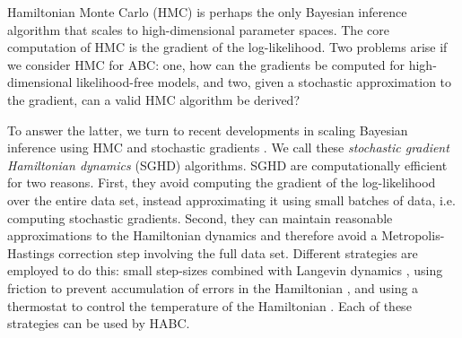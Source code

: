 \documentclass[]{article}
\begin{document}
Hamiltonian Monte Carlo (HMC) \cite{duane1987hybrid, neal2011mcmc} is perhaps the only Bayesian inference algorithm that scales to high-dimensional parameter spaces.  The core computation of HMC is the gradient of the log-likelihood.  Two problems arise if we consider HMC for ABC: one, how can the gradients be computed for high-dimensional likelihood-free models, and two, given a stochastic approximation to the gradient, can a valid HMC algorithm be derived?
 
 To answer the latter, we turn to recent developments in scaling Bayesian inference using HMC and stochastic gradients \cite{welling2011bayesian,chen2014stochastic,ding2014bayesian}.  We call these {\em stochastic gradient Hamiltonian dynamics} (SGHD) algorithms. SGHD are computationally efficient for two reasons.  First, they avoid computing the gradient of the log-likelihood over the entire data set, instead approximating it using small batches of data, i.e. computing stochastic gradients.  Second, they can maintain reasonable approximations to the Hamiltonian dynamics and therefore avoid a Metropolis-Hastings correction step involving the full data set.  Different strategies are employed to do this: small step-sizes combined with  Langevin dynamics \cite{welling2011bayesian}, using friction to prevent accumulation of errors in the Hamiltonian \cite{chen2014stochastic}, and using a thermostat to control the temperature of the Hamiltonian \cite{ding2014bayesian}.  Each of these strategies can be used by HABC.
 
\end{document}
